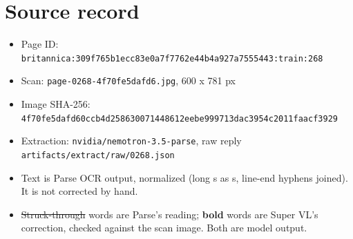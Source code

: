 \documentclass[10pt]{article}
\begin{document}
\section*{Source record}
\begin{itemize}
\item Page ID: \texttt{britannica:309f765b1ecc83e0a7f7762e44b4a927a7555443:train:268}
\item Scan: \texttt{page-0268-4f70fe5dafd6.jpg}, 600 x 781 px
\item Image SHA-256: \texttt{\small 4f70fe5dafd60ccb4d258630071448612eebe999713dac3954c2011faacf3929}
\item Extraction: \texttt{nvidia/nemotron-3.5-parse}, raw reply \texttt{artifacts/extract/raw/0268.json}
\item Text is Parse OCR output, normalized (long s as s, line-end hyphens joined). It is not corrected by hand.
\item \sout{Struck-through} words are Parse's reading; \textbf{bold} words are Super VL's correction, checked against the scan image. Both are model output.
\end{itemize}
\end{document}
